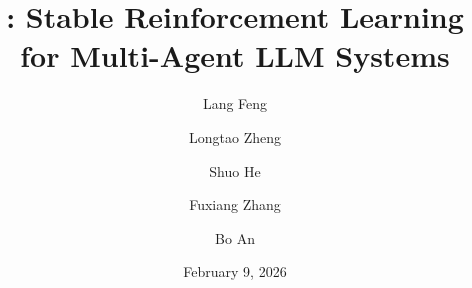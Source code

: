 \documentclass[]{fairmeta}
\title{\methodname{}: Stable Reinforcement Learning for Multi-Agent LLM Systems}
\author[1]{Lang Feng}
\author[1]{Longtao Zheng}
\author[1]{Shuo He}
\author[1]{Fuxiang Zhang}
\author[1]{Bo An}
\affiliation[1]{Nanyang Technological University, Singapore}
\date{February 9, 2026}
\begin{document}
\maketitle



\newcommand{\fix}{\marginpar{FIX}}
\newcommand{\new}{\marginpar{NEW}}







{\small


}
\appendix

\end{document}
